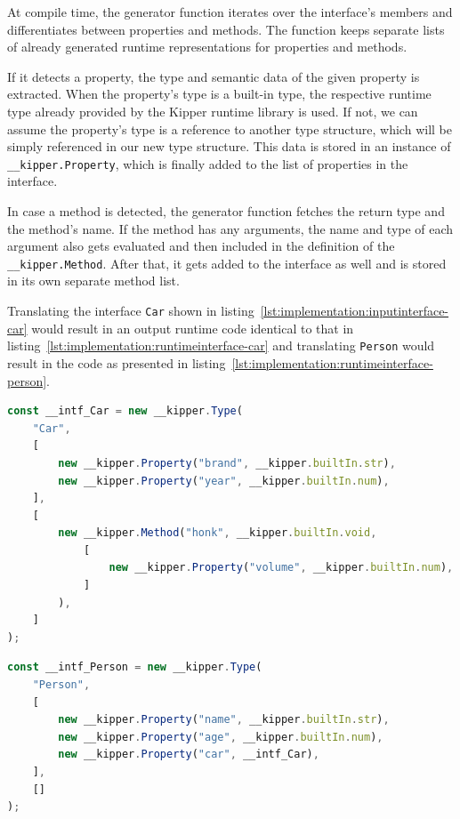 At compile time, the generator function iterates over the interface's members and differentiates between properties and methods. The function keeps separate lists of already generated runtime representations for properties and methods.

If it detects a property, the type and semantic data of the given property is extracted. When the property's type is a built-in type, the respective runtime type already provided by the Kipper runtime library is used. If not, we can assume the property's type is a reference to another type structure, which will be simply referenced in our new type structure. This data is stored in an instance of \lstinline|__kipper.Property|, which is finally added to the list of properties in the interface.

In case a method is detected, the generator function fetches the return type and the method's name. If the method has any arguments, the name and type of each argument also gets evaluated and then included in the definition of the \lstinline|__kipper.Method|. After that, it gets added to the interface as well and is stored in its own separate method list.

Translating the interface \lstinline|Car| shown in listing~\ref{lst:implementation:inputinterface-car} would result in an output runtime code identical to that in listing~\ref{lst:implementation:runtimeinterface-car} and translating \lstinline|Person| would result in the code as presented in listing~\ref{lst:implementation:runtimeinterface-person}.

\begin{lstlisting}[language=Typescript,caption=The runtime representation of the example interface \lstinline|Car|,label=lst:implementation:runtimeinterface-car]
const __intf_Car = new __kipper.Type(
	"Car",
	[
		new __kipper.Property("brand", __kipper.builtIn.str),
		new __kipper.Property("year", __kipper.builtIn.num),
	],
	[
		new __kipper.Method("honk", __kipper.builtIn.void,
			[
				new __kipper.Property("volume", __kipper.builtIn.num),
			]
		),
	]
);
\end{lstlisting}

\begin{lstlisting}[language=Typescript,caption=The runtime representation of the example interface \lstinline|Person|,label=lst:implementation:runtimeinterface-person]
const __intf_Person = new __kipper.Type(
	"Person",
	[
		new __kipper.Property("name", __kipper.builtIn.str),
		new __kipper.Property("age", __kipper.builtIn.num),
		new __kipper.Property("car", __intf_Car),
	],
	[]
);
\end{lstlisting}

